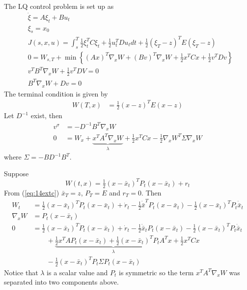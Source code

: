 \begin{example}
\label{ex:14lq}
The LQ control problem is set up as
\begin{align*}
&\dot{\xi} = A\xi_t+Bu_t \\
&\xi_s = x_0 \\
&J(s,x,u) = \int_s^T\tfrac{1}{2}\xi_t^TC\xi_t + \tfrac{1}{2}u_t^TDu_tdt + \tfrac{1}{2}(\xi_T-z)^TE(\xi_T-z) \\
&0 = W_{s,T} + \min\left\lbrace (Ax)^T\nabla_xW + (Bv)^T\nabla_xW + \tfrac{1}{2}x^TCx + \tfrac{1}{2}v^TDv \right\rbrace \\
&v^TB^T\nabla_xW + \frac{1}{2}v^TDV = 0 \\
&B^T\nabla_xW + Dv = 0
\end{align*}
The terminal condition is given by
\begin{align}
\label{eq:14extc}
W(T,x) &= \tfrac{1}{2}(x-z)^TE(x-z)
\end{align}
Let $D^{-1}$ exist, then
\begin{align*}
v^\sigma &= -D^{-1}B^T\nabla_xW \\
0 &= W_x+\underbrace{x^TA^T\nabla_xW}_{\lambda} + \tfrac{1}{2}x^TCx - \tfrac{1}{2}\nabla_xW^T\Sigma\nabla_xW
\end{align*}
where $\Sigma = -BD^{-1}B^T$.

Suppose
$$W(t,x) = \tfrac{1}{2}(x-\bar{x}_t)^TP_t(x-\bar{x}_t) + r_t$$
From (\ref{eq:14extc}) $\bar{x}_T = z$, $P_T=E$ and $r_T=0$. Then
\begin{align*}
W_t &= \tfrac{1}{2}(x-\bar{x}_t)^T\dot{P}_t(x-\bar{x}_t)+\dot{r}_t - \tfrac{1}{2}\dot{\bar{x}}^TP_t(x-\bar{x}_t) - \tfrac{1}{2}(x-\bar{x}_t)^TP_t\dot{\bar{x}}_t \\
\nabla_xW &= P_t(x-\bar{x}_t) \\
0 &= \tfrac{1}{2}(x-\bar{x}_t)^T\dot{P}_t(x-\bar{x}_t) + \dot{r}_t - \tfrac{1}{2}\dot{\bar{x}}_tP_t(x-\bar{x}_t) - \tfrac{1}{2}(x-\bar{x}_t)^TP_t\dot{\bar{x}}_t \\
&\qquad + \underbrace{\tfrac{1}{2}x^TAP_t(x-\bar{x}_t) + \tfrac{1}{2}(x-\bar{x}_t)^TP_tA^Tx}_{\lambda} + \tfrac{1}{2}x^TCx \\
&\qquad - \tfrac{1}{2}(x-\bar{x}_t)^TP_t\Sigma P_t(x-\bar{x}_t)
\end{align*}
Notice that $\lambda$ is a scalar value and $P_t$ is symmetric so the term $x^TA^T\nabla_xW$ was separated into two components above.


\end{example}
